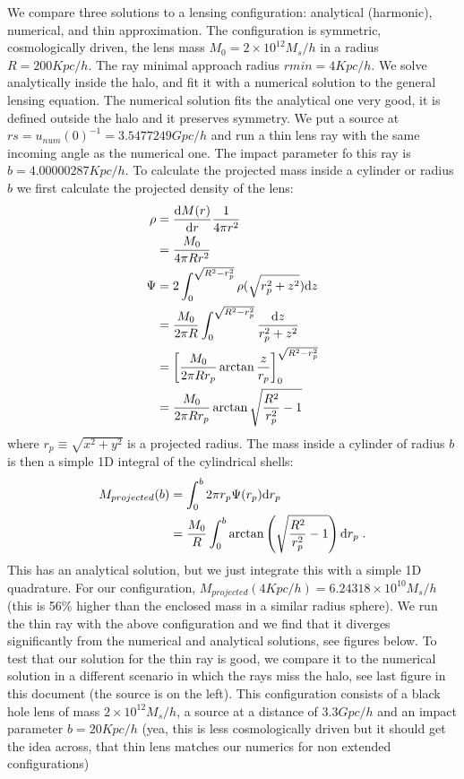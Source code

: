 \documentclass{article}
\begin{document}
We compare three solutions to a lensing configuration: analytical (harmonic), numerical, and thin approximation. The configuration is symmetric, cosmologically driven, the lens mass $M_0=2\times 10^{12} M_s/h$ in a radius $R=200 Kpc/h$. The ray minimal approach radius $rmin=4 Kpc/h$. We solve analytically inside the halo, and fit it with a numerical solution to the general lensing equation. The numerical solution fits the analytical one very good, it is defined outside the halo and it preserves symmetry. We put a source at $rs = u_{num}(0)^{-1}=3.5477249 Gpc/h$ and run a thin lens ray with the same incoming angle as the numerical one. The impact parameter fo this ray is $b=4.00000287 Kpc/h$. To calculate the projected mass inside a cylinder or radius $b$ we first calculate the projected density of the lens:
\begin{align}
    \rho &= \frac{   {\rm d}M(r)   }{   {\rm d}r   } \frac{1}{4\pi r^2}\\
    &= \frac{M_0}{4\pi Rr^2}\\
    \Psi&=2\int_0^{\sqrt{R^2-r_p^2}} \rho(\sqrt{r_p^2+z^2}) {\rm d}z \\
    &=\frac{M_0}{2\pi R} \int_0^{\sqrt{R^2-r_p^2}} \frac{{\rm d} z}{r_p^2+z^2} \\
    &=\left[ \frac{M_0}{2\pi R r_p} \arctan \frac{z}{r_p} \right] _0^{\sqrt{R^2-r_p^2}}\\
    &=\frac{M_0}{2\pi R r_p}\arctan \sqrt{\frac{R^2}{r_p^2}-1}
\end{align}
where $r_p\equiv \sqrt{x^2+y^2}$ is a projected radius. The mass inside a cylinder of radius $b$ is then a simple 1D integral of the cylindrical shells:
\begin{align}
    M_{projected}(b) &= \int_0^b 2\pi r_p \Psi(r_p) {\rm d} r_p \\
    &= \frac{M_0}{R} \int_0^b \arctan \left( \sqrt{\frac{R^2}{r_p^2}-1} \right) {\rm d} r_p\;.
\end{align}
This has an analytical solution, but we just integrate this with a simple 1D quadrature. For our configuration, $M_{projected}(4 Kpc/h) = 6.24318\times 10^{10} M_s/h$ (this is 56\% higher than the enclosed mass in a similar radius sphere). We run the thin ray with the above configuration and we find that it diverges significantly from the numerical and analytical solutions, see figures below. To test that our solution for the thin ray is good, we compare it to the numerical solution in a different scenario in which the rays miss the halo, see last figure in this document (the source is on the left). This configuration consists of a black hole lens of mass $2\times 10^{12}M_s/h$, a source at a distance of $3.3 Gpc/h$ and an impact parameter $b=20 Kpc/h$ (yea, this is less cosmologically driven but it should get the idea across, that thin lens matches our numerics for non extended configurations) 
\end{document}
